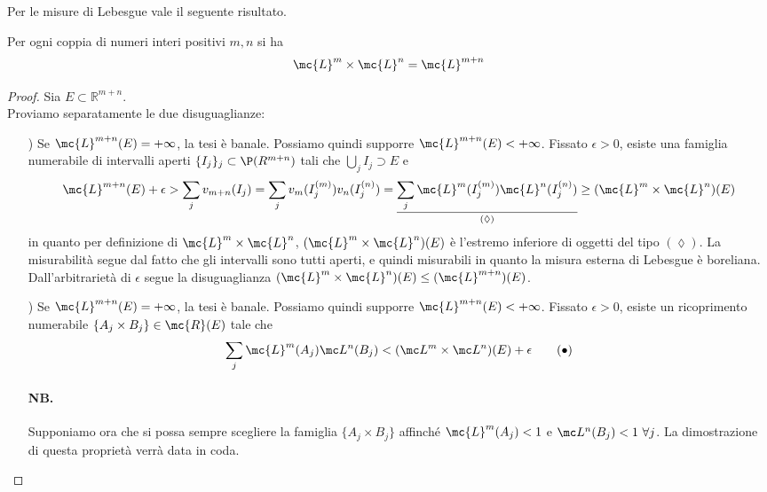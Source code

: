 Per le misure di Lebesgue vale il seguente risultato.

\begin{proposition}[$**$]\label{prop: 2.6 prodotto Ln}
    Per ogni coppia di numeri interi positivi $m, n$ si ha
    \[\mc{L}^{m} \times \mc{L}^{n}=\mc{L}^{m+n}\]
\end{proposition}
\begin{proof}
    Sia $E \subset \mathbb{R}^{m+n}$. \\
    Proviamo separatamente le due disuguaglianze:
    \begin{itemize}
        \item[\say{$\leq$})] Se $\mc{L}^{m+n}(E)=+\infty$, la tesi è banale. Possiamo quindi supporre $\mc{L}^{m+n}(E)<+\infty$. Fissato $\epsilon >0$, esiste una famiglia numerabile di intervalli aperti $\{I_j\}_j\subset \P(R^{m+
        n})$ tali che $\bigcup_jI_j\supset E$ e 
        \[\mc{L}^{m+n}(E)+\epsilon > \sum_jv_{m+n}(I_j) = \sum_jv_m(I_j^{(m)})v_n(I_j^{(n)})= \underset{(\lozenge)}{\underline{\sum_j\mc{L}^m(I_j^{(m)})\mc{L}^n(I_j^{(n)})}}\geq (\mc{L}^m\times \mc{L}^n)(E)\]
        in quanto per definizione di $\mc{L}^m\times \mc{L}^n$, $(\mc{L}^m\times \mc{L}^n)(E)$ è l'estremo inferiore di oggetti del tipo $(\lozenge)$. La misurabilità segue dal fatto che gli intervalli sono tutti aperti, e quindi misurabili in quanto la misura esterna di Lebesgue è boreliana. Dall'arbitrarietà di $\epsilon$ segue la disuguaglianza $(\mc{L}^{m} \times \mc{L}^{n})(E)\leq(\mc{L}^{m+n})(E)$.
        \item[\say{$\geq$})] Se $\mc{L}^{m+n}(E)=+\infty$, la tesi è banale. Possiamo quindi supporre $\mc{L}^{m+n}(E)<+\infty$. Fissato $\epsilon >0$, esiste un ricoprimento numerabile $\{A_j\times B_j\}\in \mc{R}(E)$ tale che 
        \[\sum_j\mc{L}^m(A_j)\mc L^n(B_j) < (\mc L^m \times \mc L^n)(E)+\epsilon\tag{$\bullet$}\]
        \paragraph{NB.} Supponiamo ora che si possa sempre scegliere la famiglia $\{A_j\times B_j\}$ affinché $\mc{L}^m(A_j)<1 $ e $\mc L^n(B_j) < 1\ \forall j$. La dimostrazione di questa proprietà verrà data in coda.


\end{itemize}
\end{proof}
